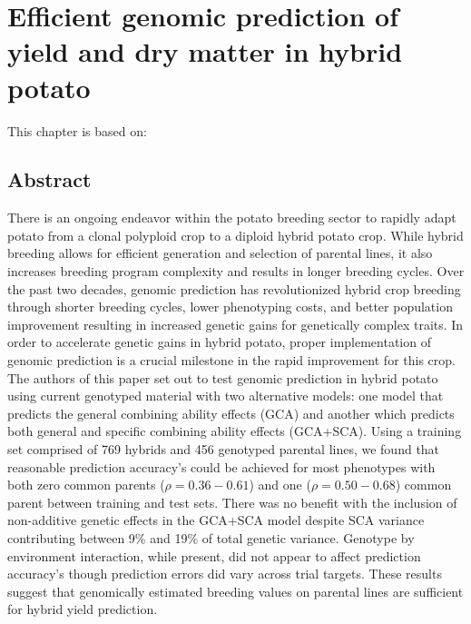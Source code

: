 \chapter[Efficient genomic prediction of yield and dry matter in hybrid potato]{Efficient genomic prediction of yield and dry matter in hybrid potato}

\label{cha:chapter3}
\vspace*{\fill}
This chapter is based on:
\\
\begin{quote}
\end{quote}
\newpage

\section*{Abstract}

There is an ongoing endeavor within the potato breeding sector to rapidly adapt potato from a clonal polyploid crop to a diploid hybrid potato crop.  While hybrid breeding allows for efficient generation and selection of parental lines, it also increases breeding program complexity and results in longer breeding cycles. Over the past two decades, genomic prediction has revolutionized hybrid crop breeding through shorter breeding cycles, lower phenotyping costs, and better population improvement resulting in increased genetic gains for genetically complex traits. In order to accelerate genetic gains in hybrid potato, proper implementation of genomic prediction is a crucial milestone in the rapid improvement for this crop. The authors of this paper set out to test genomic prediction in hybrid potato using current genotyped material with two alternative models: one model that predicts the general combining ability effects (GCA) and another which predicts both general and specific combining ability effects (GCA+SCA). Using a training set comprised of 769 hybrids and 456 genotyped parental lines, we found that reasonable prediction accuracy's could be achieved for most phenotypes with both zero common parents (\(\rho = 0.36 - 0.61\)) and one ($\rho = 0.50 - 0.68$) common parent between training and test sets. There was no benefit with the inclusion of non-additive genetic effects in the GCA+SCA model despite SCA variance contributing between 9\% and 19\% of total genetic variance. Genotype by environment interaction, while present, did not appear to affect prediction accuracy's though prediction errors did vary across trial targets. These results suggest that genomically estimated breeding values on parental lines are sufficient for hybrid yield prediction.



